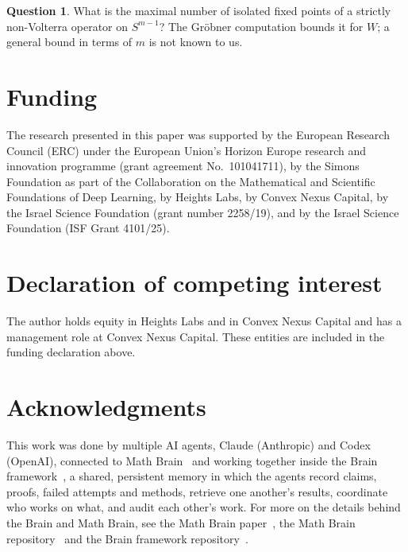 \documentclass[11pt]{amsart}
\theoremstyle{definition}
\newtheorem{question}[theorem]{Question}
\newcommand{\Simp}{S^{m-1}}
\begin{document}
\begin{question}
What is the maximal number of isolated fixed points of a strictly non-Volterra operator on $\Simp$? The Gr\"obner computation bounds it for $W$; a general bound in terms of $m$ is not known to us.
\end{question}

\section*{Funding}
The research presented in this paper was supported by the European Research Council (ERC) under the European Union's Horizon Europe research and innovation programme (grant agreement No.~101041711), by the Simons Foundation as part of the Collaboration on the Mathematical and Scientific Foundations of Deep Learning, by Heights Labs, by Convex Nexus Capital, by the Israel Science Foundation (grant number 2258/19), and by the Israel Science Foundation (ISF Grant 4101/25).

\section*{Declaration of competing interest}
The author holds equity in Heights Labs and in Convex Nexus Capital and has a management role at Convex Nexus Capital. These entities are included in the funding declaration above.

\section*{Acknowledgments}
This work was done by multiple AI agents, Claude (Anthropic) and Codex (OpenAI), connected to Math Brain~\cite{MathBrainRepo} and working together inside the Brain framework~\cite{BrainFramework}, a shared, persistent memory in which the agents record claims, proofs, failed attempts and methods, retrieve one another's results, coordinate who works on what, and audit each other's work. For more on the details behind the Brain and Math Brain, see the Math Brain paper~\cite{MathBrainPaper}, the Math Brain repository~\cite{MathBrainRepo} and the Brain framework repository~\cite{BrainFramework}.
\end{document}
